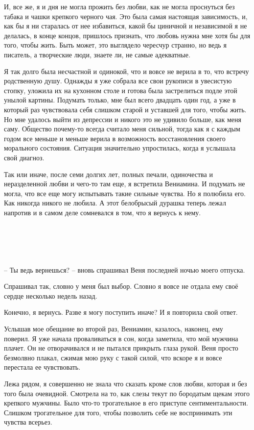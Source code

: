 \documentclass[
]{book}
\begin{document}
И, все же, я и дня не могла прожить без любви, как не могла проснуться без табака и чашки крепкого черного чая. Это была самая настоящая зависимость, и, как бы я ни старалась от нее избавиться, какой бы циничной и независимой я не делалась, в конце концов, пришлось признать, что любовь нужна мне хотя бы для того, чтобы жить. Быть может, это выглядело чересчур странно, но ведь я писатель, а творческие люди, знаете ли, не самые адекватные.

Я так долго была несчастной и одинокой, что и вовсе не верила в то, что встречу родственную душу. Однажды я уже собрала все свои рукописи в увесистую стопку, уложила их на кухонном столе и готова была застрелиться подле этой унылой картины. Подумать только, мне был всего двадцать один год, а уже в который раз чувствовала себя слишком старой и уставшей для того, чтобы жить. Но мне удалось выйти из депрессии и никого это не удивило больше, как меня саму. Общество почему-то всегда считало меня сильной, тогда как я с каждым годом все меньше и меньше верила в возможность восстановления своего морального состояния. Ситуация значительно упростилась, когда я услышала свой диагноз.

Так или иначе, после семи долгих лет, полных печали, одиночества и неразделенной любви и чего-то там еще, я встретила Вениамина. И подумать не могла, что все еще могу испытывать такие сильные чувства. Но я полюбила его. Как никогда никого не любила. А этот белобрысый дурашка теперь лежал напротив и в самом деле сомневался в том, что я вернусь к нему.

\hypertarget{chapter-36}{%
\chapter{~}\label{chapter-36}}

-- Ты ведь вернешься? -- вновь спрашивал Веня последней ночью моего отпуска.

Спрашивал так, словно у меня был выбор. Словно я вовсе не отдала ему своё сердце несколько недель назад.

Конечно, я вернусь. Разве я могу поступить иначе? И я повторила свой ответ.

Услышав мое обещание во второй раз, Вениамин, казалось, наконец, ему поверил. Я уже начала проваливаться в сон, когда заметила, что мой мужчина плачет. Он не отворачивался и не пытался прикрыть глаза рукой. Веня просто безмолвно плакал, сжимая мою руку с такой силой, что вскоре я и вовсе перестала ее чувствовать.

Лежа рядом, я совершенно не знала что сказать кроме слов любви, которая и без того была очевидной. Смотрела на то, как слезы текут по бородатым щекам этого крепкого мужчины. Было что-то трогательное в его приступе сентиментальности. Слишком трогательное для того, чтобы позволить себе не воспринимать эти чувства всерьез.
\end{document}
